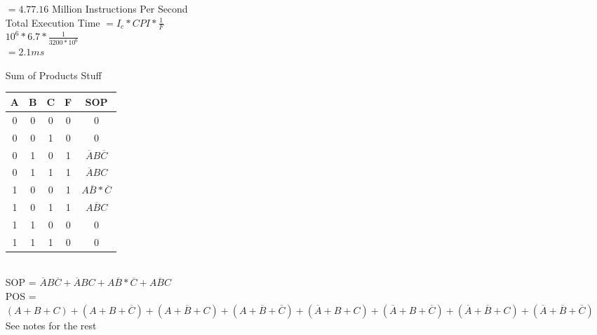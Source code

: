 \documentclass[12pt,largemargins]{article}
\begin{document}
\begin{itemize}
$=4.77.16$ Million Instructions Per Second\\
Total Execution Time $=I_c  *CPI * \frac{1}{F}$\\
$10^6 * 6.7 * \frac{1}{3200*10^6}$\\
$=2.1ms$\\
\item[Sum of Products Stuff]
\begin{tabular}{|c|c|c|c|c|}
\hline
A&B&C&F&SOP\\
\hline
0&0&0&0&0\\
0&0&1&0&0\\
0&1&0&1&$\overline{A}B\overline{C}$\\
0&1&1&1&$\overline{A}BC$\\
1&0&0&1&$A\overline{B}* \overline{C}$\\
1&0&1&1&$A\overline{B}C$\\
1&1&0&0&0\\
1&1&1&0&0\\
\hline
\end{tabular}\\
SOP = $\overline{A}B\overline{C} + \overline{A}BC + A\overline{B}*\overline{C} + A\overline{B}C$\\
POS = $(A+B+C)+(A+B+\overline{C}) + (A+\overline{B}+C)+(A+\overline{B}+\overline{C}) + (\overline{A}+B+C)+(\overline{A}+B+\overline{C})+(\overline{A}+\overline{B}+C)+(\overline{A} + \overline{B}+\overline{C})$
See notes for the rest
\end{itemize}
\end{document}
